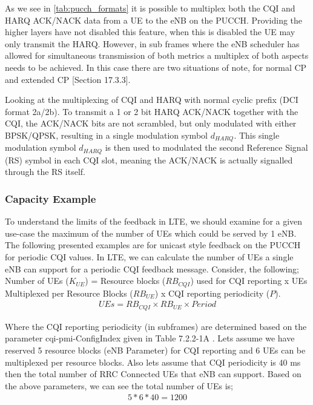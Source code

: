 \documentclass{article}
\begin{document}
As we see in \cref{tab:pucch_formats} it is possible to multiplex both the CQI and HARQ ACK/NACK data from a UE to the eNB on the PUCCH. Providing the higher layers have not disabled this feature, when this is disabled the UE may only transmit the HARQ. However, in sub frames where the eNB scheduler has allowed for simultaneous transmission of both metrics a multiplex of both aspects needs to be achieved. In this case there are two situations of note, for normal CP and extended CP \cite{umts_sesia}[Section 17.3.3]. 

Looking at the multiplexing of CQI and HARQ with normal cyclic prefix (DCI format 2a/2b). To transmit a 1 or 2 bit HARQ ACK/NACK together with the CQI, the ACK/NACK bits are not scrambled, but only modulated with either BPSK/QPSK, resulting in a single modulation symbol $d_{HARQ}$.  This single modulation symbol $d_{HARQ}$ is then used to modulated the second Reference Signal (RS) symbol in each CQI slot, meaning the ACK/NACK is actually signalled through the RS itself.

\subsubsection{Capacity Example}
To understand the limits of the feedback in LTE, we should examine for a given use-case the maximum of the number of UEs which could be served by 1 \ac{eNB}. The following presented examples are for unicast style feedback on the \ac{PUCCH} for periodic CQI values. In LTE, we can calculate the number of UEs a single \ac{eNB} can support for a periodic CQI feedback message. Consider, the following; Number of UEs ($K_{UE}$) =  Resource blocks ($RB_{CQI}$) used for CQI reporting x UEs Multiplexed per Resource Blocks ($RB_{UE}$) x CQI reporting periodicity ($P$). 
    \begin{align}
        UEs = RB_{CQI} \times RB_{UE} \times Period
     \label{eq:pucch_capacity}
    \end{align}
    
Where the CQI reporting periodicity (in subframes) are determined based on the parameter cqi-pmi-ConfigIndex given in Table 7.2.2-1A \cite{ETSITS136213}. Lets assume we have reserved 5 resource blocks (eNB Parameter) for CQI reporting and 6 UEs can be multiplexed per resource blocks. Also lets assume that CQI periodicity is 40 ms then the total number of RRC Connected UEs that eNB can support. Based on the above parameters, we can see the total number of UEs is;
\begin{align}
    5 * 6 * 40 = 1200 
\end{align}
\end{document}
